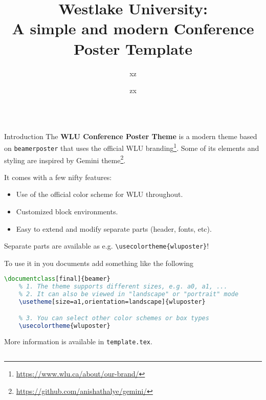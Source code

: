 \documentclass[final]{beamer}
\title{Westlake University: \\[0.5em] A simple and modern Conference Poster Template}
\author{xz\inst{1} \and zx\inst{2}}
\institute[shortinst]{\inst{1} Westlake University \quad \inst{2} Westlake University}
\begin{document}
\begin{frame}[fragile]

\begin{columns}[t]

\separatorcolumn

\begin{column}{0.3\paperwidth}

\begin{block}{Introduction}
    The \textbf{WLU Conference Poster Theme} is a modern theme based on
    \texttt{beamerposter} that uses the official
    \textcolor{WLULightBlue}{WLU branding}\footnote{\url{https://www.wlu.ca/about/our-brand/}}. Some
    of its elements and styling are inspired by \textcolor{WLULightBlue}{Gemini}
    theme\footnote{\url{https://github.com/anishathalye/gemini/}}.

    \bigskip
    It comes with a few nifty features:
    \begin{itemize}
        \item Use of the official color scheme for WLU throughout.
        \item Customized block environments.
        \item Easy to extend and modify separate parts (header, fonts, etc).
    \end{itemize}

    \bigskip
    Separate parts are available as e.g. \texttt{\textbackslash usecolortheme\{wluposter\}}!
    \bigskip

    To use it in you documents add something like the following

    \begin{center}
    \begin{lstlisting}[language=TeX]
    \documentclass[final]{beamer}
    % 1. The theme supports different sizes, e.g. a0, a1, ...
    % 2. It can also be viewed in "landscape" or "portrait" mode
    \usetheme[size=a1,orientation=landscape]{wluposter}

    % 3. You can select other color schemes or box types
    \usecolortheme{wluposter}
    \end{lstlisting}
    \end{center}

    \bigskip
    More information is available in \texttt{template.tex}.
    \bigskip
\end{block}


\end{column}
\end{columns}
\end{frame}
\end{document}
